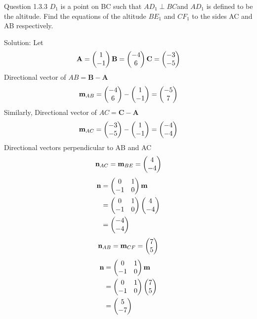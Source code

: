 \documentclass[12pt]{article}
\begin{document}
\let\vec\mathbf

Question 1.3.3 $D_{1}$ is a point on BC such that
$AD_{1}\perp BC$and $AD_{1} $ is defined to be the altitude.
Find the equations of the altitude $BE_{1} $ and $CF_{1}$
to the sides AC and AB respectively.

  
{Solution}:
Let 
\begin{align}\vec{A}=\myvec{1\\-1\\}
\vec{B}=\myvec{-4 \\6 \\}
\vec{C}=\myvec{-3\\-5\\}
\end{align}
Directional vector of $AB=\vec{B}-\vec{A}$
\begin{align}
\vec{m}_{AB}=\myvec{-4\\6\\}
-\myvec{1\\-1 \\}
=\myvec{-5\\7\\}
\end{align}
Similarly,
Directional vector of $AC=\vec{C}-\vec{A}$
\begin{align}
\vec{m}_{AC}=\myvec{-3\\-5\\}
-\myvec{1\\-1\\}
=\myvec{-4\\-4\\}
\end{align}
Directional vectors perpendicular to AB and AC
\begin{align}
\vec{n}_{AC}=\vec{m}_{BE}=\myvec{4\\-4}
\end{align}
\begin{align}
\vec{n} &= \myvec{0&1 \\ -1&0}\vec{m}\\
&= \myvec{0&1 \\ -1&0}\myvec{4 \\ -4}\\
&= \myvec{-4 \\ -4}
\end{align}
\begin{align}
\vec{n}_{AB}=\vec{m}_{CF}=\myvec{7\\5}
\end{align}
\begin{align}
\vec{n} &= \myvec{0&1 \\ -1&0}\vec{m}\\
&= \myvec{0&1 \\ -1&0}\myvec{7 \\ 5}\\
&= \myvec{5 \\ -7}
\end{align}
\end{document}
